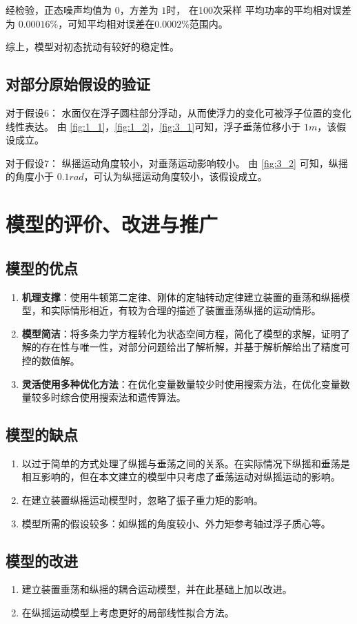 \documentclass[withoutpreface,bwprint]{cumcmthesis} %
\begin{document}
        经检验，正态噪声均值为 $0$，方差为 $1$时， 在100次采样 平均功率的平均相对误差为 $0.00016\%$，可知平均相对误差在$0.0002\%$范围内。

    综上，模型对初态扰动有较好的稳定性。
    \subsection{对部分原始假设的验证}
    对于假设6： 水面仅在浮子圆柱部分浮动，从而使浮力的变化可被浮子位置的变化线性表达。
    由 \cref{fig:1_1}，\cref{fig:1_2}，\cref{fig:3_1}可知，浮子垂荡位移小于 $1m$，该假设成立。

    对于假设7： 纵摇运动角度较小，对垂荡运动影响较小。
    由 \cref{fig:3_2} 可知，纵摇的角度小于 $0.1 rad$，可认为纵摇运动角度较小，该假设成立。
    \section{模型的评价、改进与推广}
    \subsection{模型的优点}
    \begin{enumerate}
        \item \textbf{机理支撑}：使用牛顿第二定律、刚体的定轴转动定律建立装置的垂荡和纵摇模型，和实际情形相近，有较为合理的描述了装置垂荡纵摇的运动情形。
        \item \textbf{模型简洁}：将多条力学方程转化为状态空间方程，简化了模型的求解，证明了解的存在性与唯一性，对部分问题给出了解析解，并基于解析解给出了精度可控的数值解。
        \item \textbf{灵活使用多种优化方法}：在优化变量数量较少时使用搜索方法，在优化变量数量较多时综合使用搜索法和遗传算法。
    \end{enumerate}
    \subsection{模型的缺点}
    \begin{enumerate}
        \item 以过于简单的方式处理了纵摇与垂荡之间的关系。在实际情况下纵摇和垂荡是相互影响的，但在本文建立的模型中只考虑了垂荡运动对纵摇运动的影响。
        \item 在建立装置纵摇运动模型时，忽略了振子重力矩的影响。
        \item 模型所需的假设较多：如纵摇的角度较小、外力矩参考轴过浮子质心等。
    \end{enumerate}
    \subsection{模型的改进}
    \begin{enumerate}
        \item 建立装置垂荡和纵摇的耦合运动模型，并在此基础上加以改进。
        \item 在纵摇运动模型上考虑更好的局部线性拟合方法。
    \end{enumerate}
\end{document}
